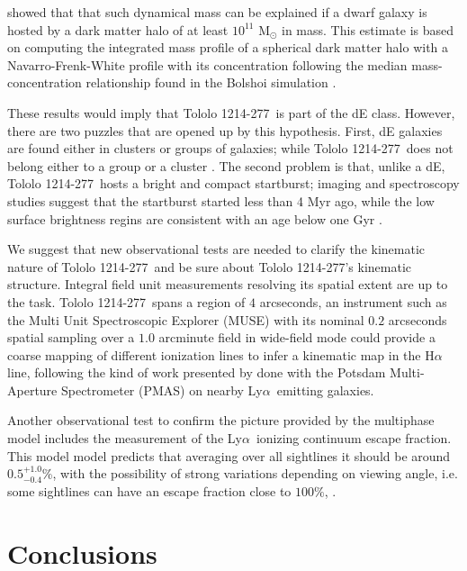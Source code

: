 \documentclass[a4,useAMS,usenatbib,usegraphicx]{mn2e}
\newcommand{\tol}{Tololo 1214-277}
\newcommand{\lya}{Ly$\alpha$}
\begin{document}
\cite{2011ApJ...726..108T} showed that  that such dynamical
mass can be explained if a dwarf galaxy is hosted by a dark matter halo of at
least $10^{11}$ M$_{\odot}$ in mass. 
This estimate is based on computing the integrated mass profile of a
spherical dark matter halo with a Navarro-Frenk-White profile with its
concentration following the median mass-concentration
relationship found in the Bolshoi simulation
\citep{2012MNRAS.423.3018P}.  

These results would imply that \tol\ is part of the dE
class. 
However, there are two puzzles that are opened up by this hypothesis. 
First, dE galaxies are found either in clusters or groups of
galaxies; while \tol\ does not belong either to a group or a cluster
\citep{2001AJ....121..169F}. 
The second problem is that, unlike a dE, \tol\ hosts a bright and compact
startburst; imaging and spectroscopy studies suggest that the
startburst started less than 4 Myr ago, while the low surface
brightness regins are consistent with an age below one Gyr
\citep{2001AJ....121..169F}.

We suggest that new observational tests are needed to clarify the
kinematic nature of \tol\ and be sure about \tol's kinematic
structure. 
Integral field unit measurements resolving its spatial extent are up
to the task.  
\tol\ spans a region of $4$ arcseconds,
an instrument such as the Multi Unit Spectroscopic Explorer (MUSE)
\citep{2014Msngr.157...13B} with its nominal $0.2$ arcseconds spatial
sampling over a $1.0$ arcminute field in wide-field mode could provide
a coarse mapping of different ionization lines to infer a kinematic
map in the H$\alpha$ line, following the kind of work presented by
\citet{Herenz16} done with the Potsdam Multi-Aperture Spectrometer
(PMAS) \citep{PMAS} on nearby \lya\ emitting galaxies. 

Another observational test to confirm the picture provided by the
multiphase model includes the measurement of the \lya\ ionizing
continuum escape fraction. 
This model model predicts that averaging over all sightlines
it should be around $0.5^{+1.0}_{-0.4}$\%, with the possibility of strong
variations depending on viewing angle, i.e. some sightlines can have
an escape fraction close to $100\%$, \citep{Gronke2016}. 



\section{Conclusions}
\label{sec:conclusions}
\end{document}

